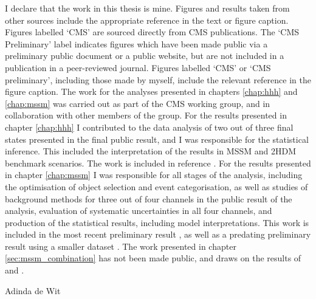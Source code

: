 \begin{declaration}
  \vspace*{1cm}
  I declare that the work in this thesis is mine. Figures and results taken from other sources
include the appropriate reference in the text or figure caption. Figures labelled `CMS' are sourced
directly from CMS publications. The `CMS Preliminary' label indicates figures which
have been made public via a preliminary public document or a public website, but are not
included in a publication in a peer-reviewed journal. Figures labelled `CMS' or `CMS preliminary', 
including those made by myself, include the relevant reference in the figure caption.
The work for the analyses presented in chapters \ref{chap:hhh} and \ref{chap:mssm} was 
carried out as part of the CMS \Htotautau working group, and in collaboration with other members of the group.
For the results presented in chapter \ref{chap:hhh} I contributed to the data analysis of two out of three
final states presented in the final public result, and I 
was responsible for the statistical inference. This included
the interpretation of the results in MSSM and 2HDM benchmark scenarios. The 
work is included in reference \cite{CMS-HIG-14-034}. For the results presented in chapter \ref{chap:mssm}
I was responsible for all stages of the analysis, including the optimisation
of object selection and event categorisation, as well as studies of background
methods for three out of four channels in the public result of the analysis,
evaluation of systematic uncertainties in all four channels, and production of the statistical
results, including model interpretations. This work is included in the most recent
preliminary result \cite{CMS-PAS-HIG-16-037}, as well as a predating preliminary
result using a smaller dataset \cite{CMS-PAS-HIG-16-006}.
The work presented in chapter \ref{sec:mssm_combination} has
not been made public, and draws on the results of \cite{CMS-PAS-HIG-16-037} and \cite{CMS-PAS-HIG-16-006}.

  \begin{flushright}
  Adinda de Wit
  \end{flushright}
\end{declaration}




\tableofcontents
\listoffigures
\listoftables




